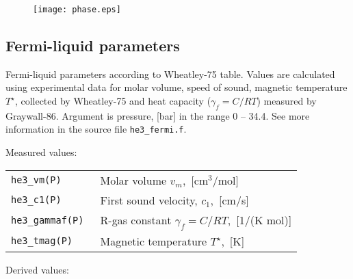 \documentclass[a4paper]{article}
\begin{document}
\begin{figure}
\texttt{[image: phase.eps]}
\end{figure}

{\small}

\eject
\subsection*{Fermi-liquid parameters}

Fermi-liquid parameters according to {Wheatley-75} table. Values are
calculated using experimental data for molar volume, speed of sound,
magnetic temperature $T^\star$, collected by {Wheatley-75} and heat
capacity ($\gamma_f=C/RT$) measured by {Graywall-86}. Argument is
pressure, [bar] in the range 0 -- 34.4. See more information in the
source file {\tt he3\_fermi.f}.

Measured values:

\medskip
\begin{tabular}{lp{9cm}}
\tt he3\_vm(P)     & Molar volume $v_m$,~[cm$^3$/mol]\\
\tt he3\_c1(P)     & First sound velocity, $c_1$,~[cm/s]\\
\tt he3\_gammaf(P) & R-gas constant $\gamma_f = C/RT$,~[1/(K mol)]\\
\tt he3\_tmag(P)   & Magnetic temperature $T^\star$,~[K]\newline\\
\end{tabular}
\medskip

Derived values:
\end{document}
